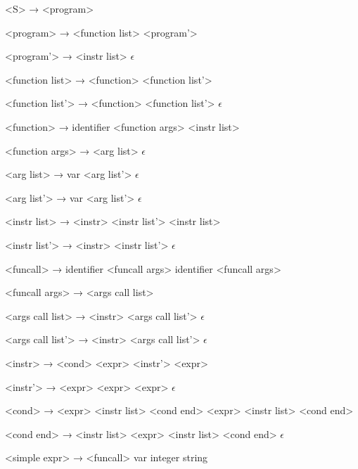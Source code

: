 ﻿<S>              → <program> 

<program>        → <function list> <program'>

<program'>       → <instr list>
                 \alt $\epsilon$ 

<function list>  → <function> <function list'>
                 
<function list'> → <function> <function list'>
		 \alt $\epsilon$

<function>       →  identifier <function args> \lit{\{} <instr list> \lit{\}}

<function args>  → \lit{(} <arg list> \lit{)}
                 \alt $\epsilon$

<arg list>       → var <arg list'>
                 \alt $\epsilon$

<arg list'>      → \lit{,} var <arg list'>
                 \alt $\epsilon$

<instr list>     → <instr> \lit{;} <instr list'>
                 \alt \lit{\{} <instr list> \lit{\}}

<instr list'>    → <instr> \lit{;} <instr list'>
                 \alt $\epsilon$

<funcall>        → \lit{\&} identifier <funcall args>
                 \alt identifier <funcall args>

<funcall args>   → \lit{(} <args call list> \lit{)}

<args call list> → <instr> <args call list'>
                 \alt $\epsilon$

<args call list'> → \lit{,} <instr> <args call list'>
                  \alt $\epsilon$

<instr>          → <cond>
                 \alt <expr> <instr'> 
                 \alt {} <expr>

<instr'>         → \lit{=} <expr>
                 \alt {} <expr>
                 \alt {} <expr>
                 \alt $\epsilon$

<cond>           →  <expr> \lit{\{} <instr list> \lit{\}} <cond end>
                 \alt {} <expr> \lit{\{} <instr list> \lit{\}} <cond end>

<cond end>       →  \lit{\{} <instr list> \lit{\}}
                 \alt {} <expr> \lit{\{} <instr list> \lit{\}} <cond end>
                 \alt $\epsilon$

<simple expr>    → <funcall>
                 \alt var
                 \alt integer
                 \alt string

